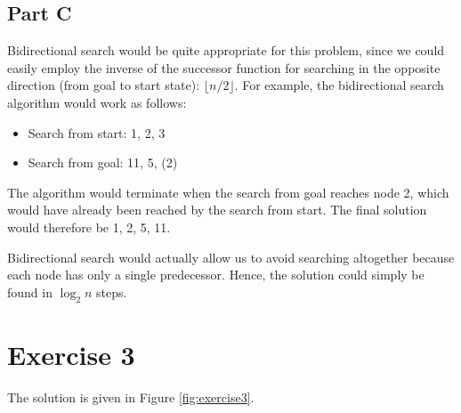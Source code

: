 \subsection*{Part C}

Bidirectional search would be quite appropriate for this problem, since we could easily employ the inverse of the successor function for searching in the opposite direction (from goal to start state): $\lfloor n/2 \rfloor$. For example, the bidirectional search algorithm would work as follows:

\begin{itemize}

\item Search from start: 1, 2, 3

\item Search from goal: 11, 5, (2)

\end{itemize}

The algorithm would terminate when the search from goal reaches node 2, which would have already been reached by the search from start. The final solution would therefore be 1, 2, 5, 11.

Bidirectional search would actually allow us to avoid searching altogether because each node has only a single predecessor. Hence, the solution could simply be found in $\log_2{n}$ steps.

\section*{Exercise 3}

The solution is given in Figure \ref{fig:exercise3}.

